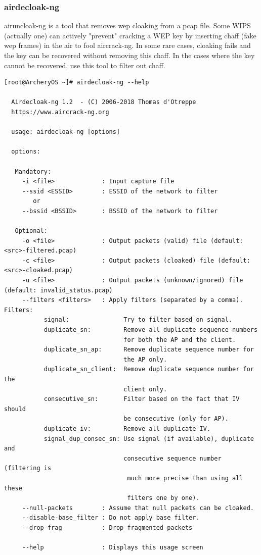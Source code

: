 \documentclass{article}
\begin{document}
\subsubsection{airdecloak-ng}
airuncloak-ng  is  a tool that removes wep cloaking from a pcap file. Some WIPS (actually one) can actively "prevent" cracking a WEP key by inserting chaff  (fake  wep  frames)  in  the  air to fool aircrack-ng. In some rare cases, cloaking fails and the key can be recovered without  removing  this chaff.  In  the  cases where the key cannot be recovered, use this tool to filter out chaff.
\begin{lstlisting}
[root@ArcheryOS ~]# airdecloak-ng --help

  Airdecloak-ng 1.2  - (C) 2006-2018 Thomas d'Otreppe
  https://www.aircrack-ng.org

  usage: airdecloak-ng [options]

  options:

   Mandatory:
     -i <file>             : Input capture file
     --ssid <ESSID>        : ESSID of the network to filter
        or
     --bssid <BSSID>       : BSSID of the network to filter

   Optional:
     -o <file>             : Output packets (valid) file (default: <src>-filtered.pcap)
     -c <file>             : Output packets (cloaked) file (default: <src>-cloaked.pcap)
     -u <file>             : Output packets (unknown/ignored) file (default: invalid_status.pcap)
     --filters <filters>   : Apply filters (separated by a comma). Filters:
           signal:               Try to filter based on signal.
           duplicate_sn:         Remove all duplicate sequence numbers
                                 for both the AP and the client.
           duplicate_sn_ap:      Remove duplicate sequence number for
                                 the AP only.
           duplicate_sn_client:  Remove duplicate sequence number for the
                                 client only.
           consecutive_sn:       Filter based on the fact that IV should
                                 be consecutive (only for AP).
           duplicate_iv:         Remove all duplicate IV.
           signal_dup_consec_sn: Use signal (if available), duplicate and
                                 consecutive sequence number (filtering is
                                  much more precise than using all these
                                  filters one by one).
     --null-packets        : Assume that null packets can be cloaked.
     --disable-base_filter : Do not apply base filter.
     --drop-frag           : Drop fragmented packets

     --help                : Displays this usage screen
\end{lstlisting}
\end{document}
